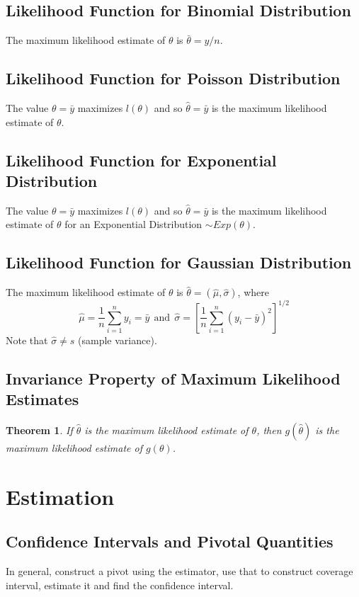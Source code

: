 \documentclass[12pt]{article}
\theoremstyle{definition}
\newtheorem*{theorem}{Theorem}
\begin{document}
  \subsection{Likelihood Function for Binomial Distribution}
  The maximum likelihood estimate of $\theta$ is $\bar{\theta} = y / n$.

  \subsection{Likelihood Function for Poisson Distribution}
  The value $\theta = \bar{y}$ maximizes $l(\theta)$ and so $\hat{\theta} = \bar{y}$ is the maximum likelihood estimate of $\theta$.

  \subsection{Likelihood Function for Exponential Distribution}
  The value $\theta = \bar{y}$ maximizes $l(\theta)$ and so $\hat{\theta} = \bar{y}$ is the maximum likelihood estimate of $\theta$ for an Exponential Distribution $\sim Exp(\theta)$.

  \subsection{Likelihood Function for Gaussian Distribution}
  The maximum likelihood estimate of $\theta$ is $\hat{\theta} = (\hat{\mu}, \hat{\sigma})$, where
  $$
  \hat{\mu} = \frac{1}{n}\sum_{i=1}^{n}y_{i} = \bar{y}
  ~~\text{and}~~
  \hat{\sigma} = \left[\frac{1}{n}\sum_{i=1}^{n}(y_{i} - \bar{y})^{2}\right]^{1/2}
  $$
  Note that $\hat{\sigma} \not = s$ (sample variance).

  \subsection{Invariance Property of Maximum Likelihood Estimates}
  \begin{theorem}
    \emph{If $\hat{\theta}$ is the maximum likelihood estimate of $\theta$, then $g(\hat{\theta})$ is the maximum likelihood estimate of $g(\theta)$.}
  \end{theorem}
  \newpage
  \section{Estimation}
  \subsection{Confidence Intervals and Pivotal Quantities}
  In general, construct a pivot using the estimator, use that to construct coverage interval, estimate it and find the confidence interval.
\end{document}
